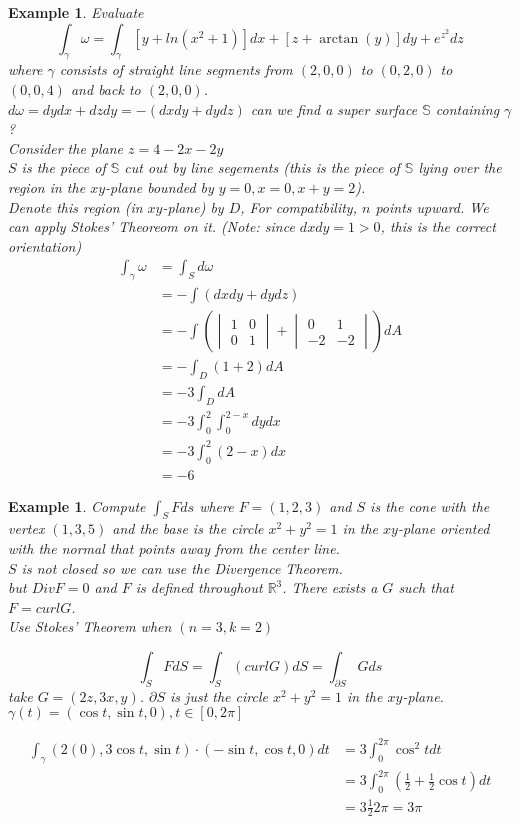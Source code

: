 \documentclass[12pt]{article}
\theoremstyle{plain}
\newtheorem{example}[theorem]{Example}
\theoremstyle{definition}
\begin{document}
\begin{example}
	Evaluate
	$$\int_\gamma \omega = \int_\gamma [y + ln(x^2 + 1)]dx + [z + \arctan(y)]dy + e^{z^2} dz$$
	where $\gamma$ consists of straight line segments from $(2,0,0)$ to $(0,2,0)$ to $(0,0,4)$ and back to $(2,0,0)$.\\
	$d\omega = dydx + dzdy = - (dxdy + dydz)$
	can we find a super surface $\mathbb{S}$ containing $\gamma$?\\

	Consider the plane $z=4-2x-2y$\\
	$S$ is the piece of $\mathbb{S}$ cut out by line segements (this is the piece of $\mathbb{S}$ lying over the region in the $xy$-plane bounded by $y=0, x=0, x+y=2$).\\
	Denote this region (in $xy$-plane) by $D$, For compatibility, $n$ points upward. We can apply Stokes' Theoreom on it. (Note: since $dxdy = 1 > 0$, this is the correct orientation)
	\begin{align*}
		\int_\gamma \omega &= \int_S d\omega\\
		&= -\int (dxdy+dydz)\\
		&= -\int (\begin{vmatrix}
1 & 0 \\
0 & 1
\end{vmatrix} + \begin{vmatrix}
0 & 1 \\
-2 & -2
\end{vmatrix})dA\\
&= -\int_D (1+2)dA\\
&= -3\int_D dA\\
&= -3\int^2_0 \int^{2-x}_0 dydx\\
&= -3\int^2_0 (2-x)dx\\
&= -6
	\end{align*}
\end{example}

\begin{example}
	Compute $\int_S Fds$ where $F=(1,2,3)$ and $S$ is the cone with the vertex $(1,3,5)$ and the base is the circle $x^2+y^2 = 1$ in the $xy$-plane oriented with the normal that points away from the center line.\\
	$S$ is not closed so we can use the Divergence Theorem.\\
	but $Div F = 0$ and $F$ is defined throughout $\mathbb{R}^3$. There exists a $G$ such that $F = curl G$.\\
	Use Stokes' Theorem when $(n=3, k=2)$

	$$\int_S F dS = \int_S (curl G)dS = \int_{\partial S} G ds$$
	take $G = (2z, 3x, y)$. $\partial S$ is just the circle $x^2 + y^2 = 1$ in the $xy$-plane. $\gamma (t) = (\cos t, \sin t, 0), t \in [0,2\pi]$

	\begin{align*}
		\int_\gamma (2(0), 3\cos t, \sin t) \cdot (-\sin t, \cos t, 0)dt &=  3\int^{2\pi}_0 \cos^2 t dt\\
		&= 3\int^{2\pi}_0 (\frac{1}{2} +  \frac{1}{2} \cos t)dt\\
		&= 3 \frac{1}{2} 2\pi = 3\pi
	\end{align*}
\end{example}
\end{document}

